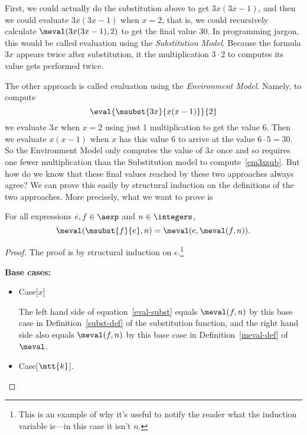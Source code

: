 \begin{definition}
First, we could actually do the substitution above to get $3x(3x-1)$, and
then we could evaluate $3x(3x-1)$ when $x =2$, that is, we
could recursively calculate $\meval(3x(3x-1),2)$ to get the
final value 30.  In programming jargon, this would be called evaluation
using the \emph{Substitution Model}.  Because the formula $3x$ appears
twice after substitution, it the multiplication $3 \cdot 2$ to computes
its value gets performed twice.

The other approach is called evaluation using the \emph{Environment
  Model}.  Namely, to compute
\begin{equation}\label{em3xsub}
\eval{\msubst{3x}{x(x-1)}}{2}
\end{equation}
we evaluate $3x$ when $x = 2$ using just 1 multiplication to get the value
6.  Then we evaluate $x(x-1)$ when $x$ has this value 6 to arrive at the
value $6\cdot 5=30$.  So the Environment Model only computes the value of
$3x$ once and so requires one fewer multiplication than the Substitution
model to compute~\eqref{em3xsub}.  But how do we know that these final
values reached by these two approaches always agree?  We can prove this
easily by structural induction on the definitions of the two approaches.
More precisely, what we want to prove is

\begin{theorem}\label{environments}
For all expressions $e,f \in \aexp$ and $n \in \integers$,
\begin{equation}\label{eval-subst}
\meval(\msubst{f}{e},n) = \meval(e, \meval(f,n)).
\end{equation}
\end{theorem}

\begin{proof}
The proof is by structural induction on $e$.\footnote{This is an
  example of why it's useful to notify the reader what the induction
  variable is---in this case it isn't $n$.}

\textbf{Base cases:}
\begin{itemize}

\item Case[$x$]

  The left hand side of equation~\eqref{eval-subst} equals $\meval(f,n)$
  by this base case in Definition~\ref{subst-def} of the substitution
  function, and the right hand side also equals $\meval(f,n)$ by this base
  case in Definition~\ref{meval-def} of $\meval$.

\item Case[$\mtt{k}$].


\end{itemize}
\end{proof}
\end{definition}
